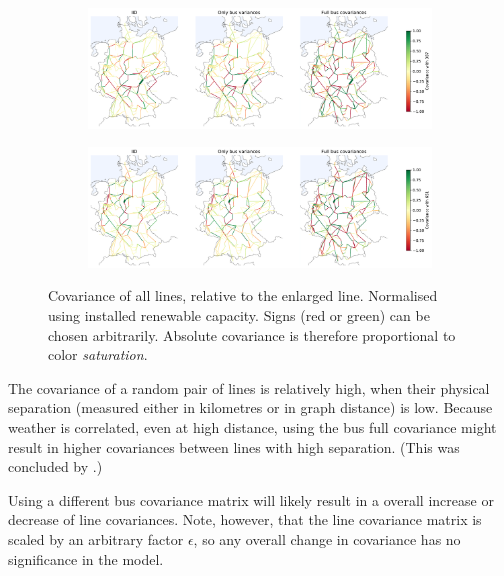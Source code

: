 \documentclass[main.tex]{subfiles}
\begin{document}
\begin{figure}[ht]
\begin{subfigure}{\textwidth}
    \centering
    \includegraphics[width=\textwidth]{img/flow_correlation_387_iid_and_justvar_and_fullcov.pdf}
    \caption{}\label{fig:linecov1}
\end{subfigure}
\begin{subfigure}{\textwidth}
    \centering
    \includegraphics[width=\textwidth]{img/flow_correlation_651_iid_and_justvar_and_fullcov.pdf}
    \caption{}\label{fig:linecov2}
\end{subfigure}
    \caption{Covariance of all lines, relative to the enlarged line. Normalised using installed renewable capacity. Signs (red or green) can be chosen arbitrarily. Absolute covariance is therefore proportional to color \emph{saturation}.}
\end{figure}

The covariance of a random pair of lines is relatively high, when their physical separation (measured either in kilometres or in graph distance) is low. Because weather is correlated, even at high distance, using the bus full covariance might result in higher covariances between lines with high separation. (This was concluded by \cite{Nesti2018emergentfailures}.) 

Using a different bus covariance matrix will likely result in a overall increase or decrease of line covariances. Note, however, that the line covariance matrix is scaled by an arbitrary factor $\epsilon$, so any overall change in covariance has no significance in the model. 
\end{document}
